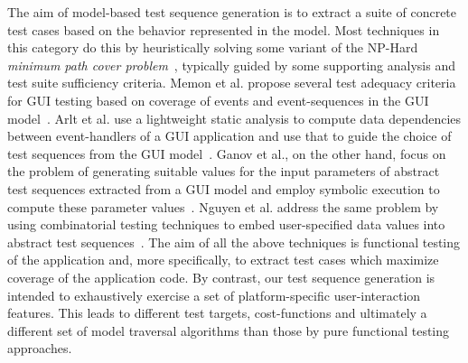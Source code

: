 The aim of model-based test sequence generation is to extract a suite
of concrete test cases based on the behavior represented in the
model. Most techniques in this category do this by heuristically
solving some variant of the NP-Hard \textit{minimum path cover
  problem}~\cite{PathCover:NtafosH79}, typically guided by some
supporting analysis and test suite sufficiency criteria. Memon et
al. propose several test adequacy criteria for GUI testing based on
coverage of events and event-sequences in the GUI
model~\cite{memon2001coverage}. Arlt et al. use a lightweight static
analysis to compute data dependencies between event-handlers of a GUI
application and use that to guide the choice of test sequences from
the GUI model~\cite{Arlt:2012:ISSRE}. Ganov et al., on the other hand,
focus on the problem of generating suitable values for the input
parameters of abstract test sequences extracted from a GUI model and
employ symbolic execution to compute these parameter
values~\cite{Ganov:2009:ICFEM}. Nguyen et al.  address the same
problem by using combinatorial testing techniques to embed
user-specified data values into abstract test
sequences~\cite{Nguyen:2012:ISSTA}. The aim of all the above
techniques is functional testing of the application and, more
specifically, to extract test cases which maximize coverage of the
application code. By contrast, our test sequence generation is
intended to exhaustively exercise a set of platform-specific
user-interaction features. This leads to different test targets,
cost-functions and ultimately a different set of model traversal
algorithms than those by pure functional testing approaches.

 

